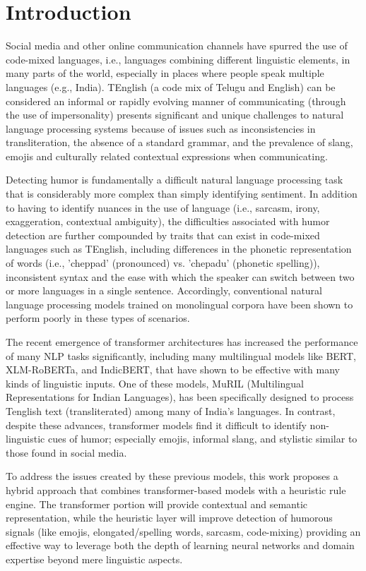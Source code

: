 \documentclass[conference]{IEEEtran}
\begin{document}
\section{Introduction}

Social media and other online communication channels have spurred the use of code-mixed languages, i.e., languages combining different linguistic elements, in many parts of the world, especially in places where people speak multiple languages (e.g., India). TEnglish (a code mix of Telugu and English) can be considered an informal or rapidly evolving manner of communicating (through the use of impersonality) presents significant and unique challenges to natural language processing systems because of issues such as inconsistencies in transliteration, the absence of a standard grammar, and the prevalence of slang, emojis and culturally related contextual expressions when communicating.

Detecting humor is fundamentally a difficult natural language processing task that is considerably more complex than simply identifying sentiment. In addition to having to identify nuances in the use of language (i.e., sarcasm, irony, exaggeration, contextual ambiguity), the difficulties associated with humor detection are further compounded by traits that can exist in code-mixed languages such as TEnglish, including differences in the phonetic representation of words (i.e., 'cheppad' (pronounced) vs. 'chepadu' (phonetic spelling)), inconsistent syntax and the ease with which the speaker can switch between two or more languages in a single sentence. Accordingly, conventional natural language processing models trained on monolingual corpora have been shown to perform poorly in these types of scenarios.

The recent emergence of transformer architectures has increased the performance of many NLP tasks significantly, including many multilingual models like BERT, XLM-RoBERTa, and IndicBERT, that have shown to be effective with many kinds of linguistic inputs. One of these models, MuRIL (Multilingual Representations for Indian Languages), has been specifically designed to process Tenglish text (transliterated) among many of India's languages. In contrast, despite these advances, transformer models find it difficult to identify non-linguistic cues of humor; especially emojis, informal slang, and stylistic similar to those found in social media.

To address the issues created by these previous models, this work proposes a hybrid approach that combines transformer-based models with a heuristic rule engine. The transformer portion will provide contextual and semantic representation, while the heuristic layer will improve detection of humorous signals (like emojis, elongated/spelling words, sarcasm, code-mixing) providing an effective way to leverage both the depth of learning neural networks and domain expertise beyond mere linguistic aspects.
\end{document}
